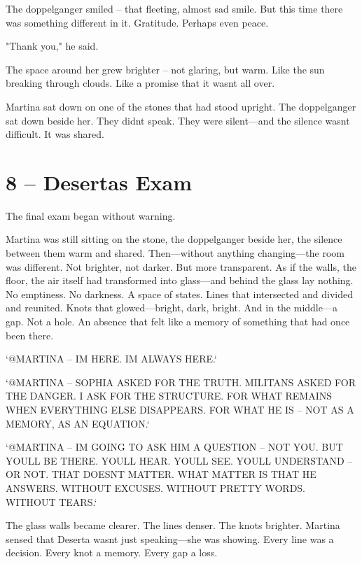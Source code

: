\documentclass[
]{article}
\begin{document}
The doppelganger smiled -- that fleeting, almost sad smile. But this time there was something different in it. Gratitude. Perhaps even peace.

"Thank you," he said.

The space around her grew brighter -- not glaring, but warm. Like the sun breaking through clouds. Like a promise that it wasn\textquotesingle t all over.

Martina sat down on one of the stones that had stood upright. The doppelganger sat down beside her. They didn\textquotesingle t speak. They were silent---and the silence wasn\textquotesingle t difficult. It was shared.

\section{8 -- Deserta\textquotesingle s Exam}\label{desertas-exam}

The final exam began without warning.

Martina was still sitting on the stone, the doppelganger beside her, the silence between them warm and shared. Then---without anything changing---the room was different. Not brighter, not darker. But more transparent. As if the walls, the floor, the air itself had transformed into glass---and behind the glass lay nothing. No emptiness. No darkness. A space of states. Lines that intersected and divided and reunited. Knots that glowed---bright, dark, bright. And in the middle---a gap. Not a hole. An absence that felt like a memory of something that had once been there.

`@MARTINA -- I\textquotesingle M HERE. I\textquotesingle M ALWAYS HERE.`

`@MARTINA -- SOPHIA ASKED FOR THE TRUTH. MILITANS ASKED FOR THE DANGER. I ASK FOR THE STRUCTURE. FOR WHAT REMAINS WHEN EVERYTHING ELSE DISAPPEARS. FOR WHAT HE IS -- NOT AS A MEMORY, AS AN EQUATION.`

`@MARTINA -- I\textquotesingle M GOING TO ASK HIM A QUESTION -- NOT YOU. BUT YOU\textquotesingle LL BE THERE. YOU\textquotesingle LL HEAR. YOU\textquotesingle LL SEE. YOU\textquotesingle LL UNDERSTAND -- OR NOT. THAT DOESN\textquotesingle T MATTER. WHAT MATTER IS THAT HE ANSWERS. WITHOUT EXCUSES. WITHOUT PRETTY WORDS. WITHOUT TEARS.`

The glass walls became clearer. The lines denser. The knots brighter. Martina sensed that Deserta wasn\textquotesingle t just speaking---she was showing. Every line was a decision. Every knot a memory. Every gap a loss.
\end{document}
